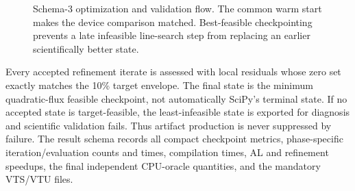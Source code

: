 \documentclass[11pt,a4paper]{article}
\begin{document}
\begin{figure}[htbp]
\centering
{}
\caption{Schema-3 optimization and validation flow.  The common warm start
makes the device comparison matched.  Best-feasible checkpointing prevents a
late infeasible line-search step from replacing an earlier scientifically
better state.}
\label{fig:flux-refinement-flow}
\end{figure}

Every accepted refinement iterate is assessed with local residuals whose zero
set exactly matches the 10\% target envelope.  The final state is the minimum
quadratic-flux feasible checkpoint, not automatically SciPy's terminal state.
If no accepted state is target-feasible, the least-infeasible state is exported
for diagnosis and scientific validation fails.  Thus artifact production is
never suppressed by failure.  The result schema records all compact checkpoint
metrics, phase-specific iteration/evaluation counts and times, compilation
times, AL and refinement speedups, the final independent CPU-oracle quantities,
and the mandatory VTS/VTU files.
\end{document}
